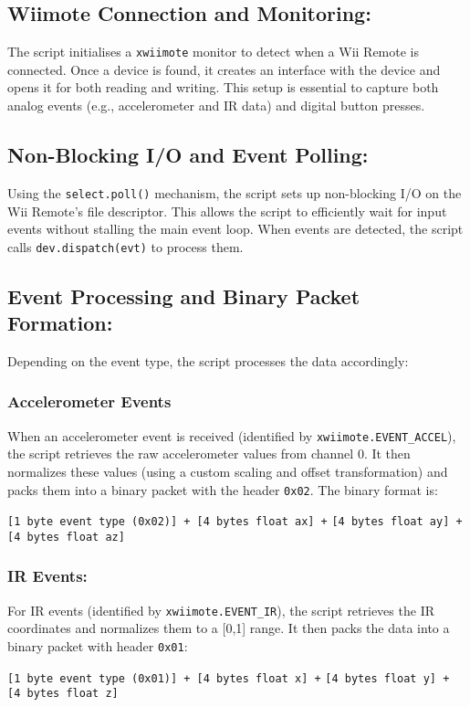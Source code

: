 \subsection*{Wiimote Connection and Monitoring:}
The script initialises a \texttt{xwiimote} monitor to detect when a Wii Remote is connected. Once a device is found, it creates an interface with the device and opens it for both reading and writing. This setup is essential to capture both analog events (e.g., accelerometer and IR data) and digital button presses.

\subsection*{Non-Blocking I/O and Event Polling:}
Using the \texttt{select.poll()} mechanism, the script sets up non-blocking I/O on the Wii Remote’s file descriptor. This allows the script to efficiently wait for input events without stalling the main event loop. When events are detected, the script calls \texttt{dev.dispatch(evt)} to process them.

\subsection*{Event Processing and Binary Packet Formation:}
Depending on the event type, the script processes the data accordingly:
\subsubsection*{Accelerometer Events}
When an accelerometer event is received (identified by \texttt{xwiimote.EVENT\_ACCEL}), the script retrieves the raw accelerometer values from channel 0. It then normalizes these values (using a custom scaling and offset transformation) and packs them into a binary packet with the header \texttt{0x02}. The binary format is:
\begin{center}
	\texttt{[1 byte event type (0x02)] + [4 bytes float ax] +}
	\texttt{[4 bytes float ay] + [4 bytes float az]}
\end{center}
\subsubsection*{IR Events:}
For IR events (identified by \texttt{xwiimote.EVENT\_IR}), the script retrieves the IR coordinates and normalizes them to a [0,1] range. It then packs the data into a binary packet with header \texttt{0x01}:
\begin{center}
	\texttt{[1 byte event type (0x01)] + [4 bytes float x] +}
	\texttt{[4 bytes float y] + [4 bytes float z]}
\end{center}
